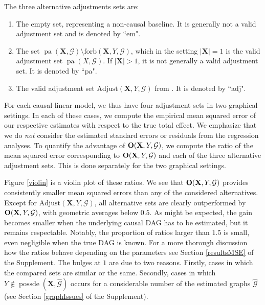 \documentclass[11pt,a4paper]{article}
\theoremstyle{definition}
\theoremstyle{remark}
\DeclareMathOperator{\pa}{pa}
\DeclareMathOperator{\possde}{possde}
\newcommand{\g}[1][G]{\mathcal{#1}}
\begin{document}
The three alternative adjustments sets are:
\begin{enumerate}[label=(\roman*)]
	\item The empty set, representing a non-causal baseline. It is generally not a valid adjustment set and is denoted by ``em".  \label{AS-em}
	\item The set $\pa(\mathbf{X},\g) \setminus \text{forb}(\mathbf{X},Y,\g)$, which in the setting $|\mathbf{X}|=1$ is the valid adjustment set $\pa(X,\g)$. If $|\mathbf{X}| > 1$, it is not generally a valid adjustment set. It is denoted by ``pa". \label{AS-pa}
	\item The valid adjustment set $\text{Adjust}(\mathbf{X},Y,\g)$ from \citet{perkovic16}. It is denoted by ``adj". \label{AS-adj}
\end{enumerate}

For each causal linear model, we thus have four adjustment sets in two graphical  settings. In each of these cases, we compute the empirical mean squared error of our respective estimates with respect to the true total effect. We emphasize that we do \emph{not} consider the estimated standard errors or residuals from the regression analyses. To quantify the advantage of $\text{\textbf{O}}(\mathbf{X},Y,\g)$, we compute the ratio of the mean squared error corresponding to $\text{\textbf{O}}(\mathbf{X},Y,\g)$ and each of the three alternative adjustment sets. This is done separately for the two graphical settings.

Figure \ref{violin} is a violin plot of these ratios.
We see that $\text{\textbf{O}}(\mathbf{X},Y,\g)$ provides consistently smaller mean squared errors than any of the considered alternatives. Except for $\text{Adjust}(\mathbf{X},Y,\g)$, all alternative sets are clearly outperformed by $\text{\textbf{O}}(\mathbf{X},Y,\g)$, with geometric averages below $0.5$. As might be expected, the gain becomes smaller when the underlying causal DAG has to be estimated, but it remains respectable. Notably, the proportion of ratios larger than $1.5$ is small, even negligible when the true DAG is known. For a more thorough discussion how the ratios behave depending on the parameters see Section \ref{resultsMSE} of the Supplement.
The bulges at $1$ are due to two reasons. Firstly, cases in which the compared sets are similar or the same. Secondly, cases in which $Y \notin \possde(\mathbf{X},\widehat{\g})$ occurs for a considerable number of the estimated graphs $\widehat{\g}$ (see Section \ref{graphIssues}  of the Supplement). 
\end{document}
